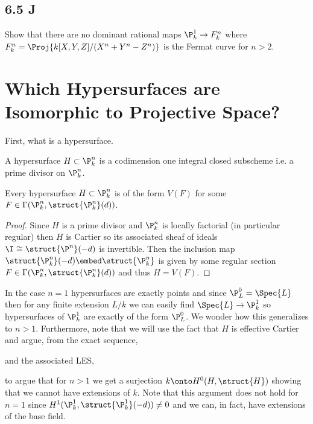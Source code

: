 \documentclass[12pt]{article}
\begin{document}
\subsection{6.5 J}

Show that there are no dominant rational maps $\P^1_k \to F^n_k$ where $F^n_k = \Proj{k[X, Y, Z]/(X^n + Y^n - Z^n)}$ is the Fermat curve for $n > 2$.


\section{Which Hypersurfaces are Isomorphic to Projective Space?}

First, what is a hypersurface. 

\begin{defn}
A hypersurface $H \subset \P^n_k$ is a codimension one integral closed subscheme i.e. a prime divisor on $\P^n_k$. 
\end{defn}

\begin{theorem}
Every hypersurface $H \subset \P^n_k$ is of the form $V(F)$ for some $F \in \Gamma(\P^n_k, \struct{\P^n_k}(d))$. 
\end{theorem}

\begin{proof}
Since $H$ is a prime divisor and $\P^n_k$ is locally factorial (in particular regular) then $H$ is Cartier so its associated sheaf of ideals $\I \cong \struct{\P^n}(-d)$ is invertible. Then the inclusion map $\struct{\P^n_k}(-d) \embed \struct{\P^n_k}$ is given by some regular section $F \in \Gamma(\P^n_k, \struct{\P^n_k}(d))$ and thus $H = V(F)$. 
\end{proof}

\begin{rmk}
In the case $n = 1$ hypersurfaces are exactly points and since $\P^0_L = \Spec{L}$ then for any finite extension $L / k$ we can easily find $\Spec{L} \to \P^1_k$ so hypersurfaces of $\P^1_k$ are exactly of the form $\P^0_L$. We wonder how this generalizes to $n > 1$. Furthermore, note that we will use the fact that $H$ is effective Cartier and argue, from the exact sequence,
\begin{center}
\end{center}
and the associated LES,
\begin{center}
\end{center}
to argue that for $n > 1$ we get a surjection $k \onto H^0(H, \struct{H})$ showing that we cannot have extensions of $k$. Note that this argument does not hold for $n = 1$ since $H^1(\P^1_k, \struct{\P^1_k}(-d)) \neq 0$ and we can, in fact, have extensions of the base field.
\end{rmk}
\end{document}
